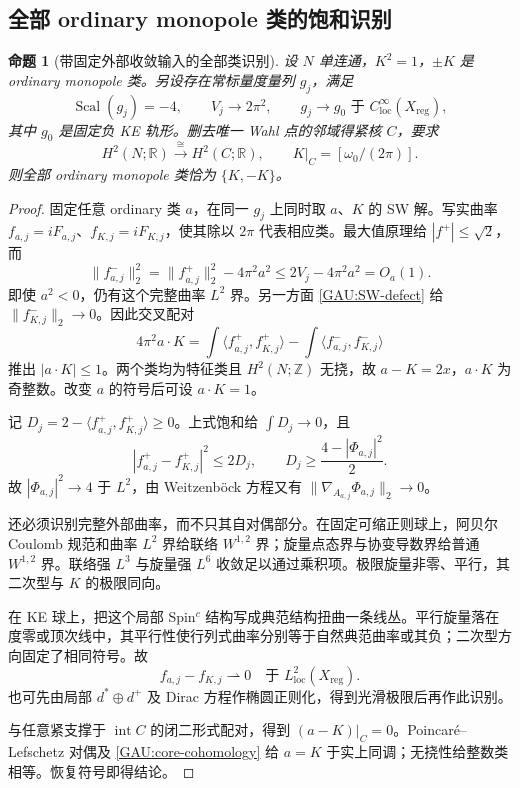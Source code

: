 \documentclass[UTF8,fontset=fandol,zihao=-4,oneside,openany]{ctexbook}
\theoremstyle{cjkplain}
\newtheorem{proposition}[theorem]{命题}
\numberwithin{equation}{chapter}
\begin{document}
\subsection{全部 ordinary monopole 类的饱和识别}

\begin{proposition}[带固定外部收敛输入的全部类识别]\label{GAU:ordinary}
设 $N$ 单连通，$K^2=1$，$\pm K$ 是 ordinary monopole 类。另设存在常标量度量列 $g_j$，满足
\[
\operatorname{Scal}(g_j)=-4,\qquad V_j\to2\pi^2,
\qquad g_j\to g_0\text{ 于 }C^\infty_{\mathrm{loc}}(X_{\mathrm{reg}}),
\]
其中 $g_0$ 是固定负 KE 轨形。删去唯一 Wahl 点的邻域得紧核 $C$，要求
\begin{equation}\label{GAU:core-cohomology}
H^2(N;\mathbb R)\xrightarrow{\cong}H^2(C;\mathbb R),
\qquad K|_C=[\omega_0/(2\pi)].
\end{equation}
则全部 ordinary monopole 类恰为 $\{K,-K\}$。
\end{proposition}
\begin{proof}
固定任意 ordinary 类 $a$，在同一 $g_j$ 上同时取 $a$、$K$ 的 SW 解。写实曲率 $f_{a,j}=iF_{a,j}$、$f_{K,j}=iF_{K,j}$，使其除以 $2\pi$ 代表相应类。最大值原理给 $|f^+|\le\sqrt2$，而
\[
\|f_{a,j}^-\|_2^2
=\|f_{a,j}^+\|_2^2-4\pi^2a^2
\le2V_j-4\pi^2a^2=O_a(1).
\]
即使 $a^2<0$，仍有这个完整曲率 $L^2$ 界。另一方面 \eqref{GAU:SW-defect} 给 $\|f_{K,j}^-\|_2\to0$。因此交叉配对
\[
4\pi^2 a\cdot K
=\int\langle f_{a,j}^+,f_{K,j}^+\rangle
 -\int\langle f_{a,j}^-,f_{K,j}^-\rangle
\]
推出 $|a\cdot K|\le1$。两个类均为特征类且 $H^2(N;\mathbb Z)$ 无挠，故 $a-K=2x$，$a\cdot K$ 为奇整数。改变 $a$ 的符号后可设 $a\cdot K=1$。

记 $D_j=2-\langle f_{a,j}^+,f_{K,j}^+\rangle\ge0$。上式饱和给 $\int D_j\to0$，且
\[
|f_{a,j}^+-f_{K,j}^+|^2\le2D_j,
\qquad D_j\ge\frac{4-|\Phi_{a,j}|^2}{2}.
\]
故 $|\Phi_{a,j}|^2\to4$ 于 $L^2$，由 Weitzenböck 方程又有 $\|\nabla_{A_{a,j}}\Phi_{a,j}\|_2\to0$。

还必须识别完整外部曲率，而不只其自对偶部分。在固定可缩正则球上，阿贝尔 Coulomb 规范和曲率 $L^2$ 界给联络 $W^{1,2}$ 界；旋量点态界与协变导数界给普通 $W^{1,2}$ 界。联络强 $L^3$ 与旋量强 $L^6$ 收敛足以通过乘积项。极限旋量非零、平行，其二次型与 $K$ 的极限同向。

在 KE 球上，把这个局部 Spin$^c$ 结构写成典范结构扭曲一条线丛。平行旋量落在度零或顶次线中，其平行性使行列式曲率分别等于自然典范曲率或其负；二次型方向固定了相同符号。故
\[
f_{a,j}-f_{K,j}\rightharpoonup0
\quad\text{于 }L^2_{\mathrm{loc}}(X_{\mathrm{reg}}).
\]
也可先由局部 $d^*\oplus d^+$ 及 Dirac 方程作椭圆正则化，得到光滑极限后再作此识别。

与任意紧支撑于 $\operatorname{int}C$ 的闭二形式配对，得到 $(a-K)|_C=0$。Poincaré--Lefschetz 对偶及 \eqref{GAU:core-cohomology} 给 $a=K$ 于实上同调；无挠性给整数类相等。恢复符号即得结论。
\end{proof}
\end{document}
